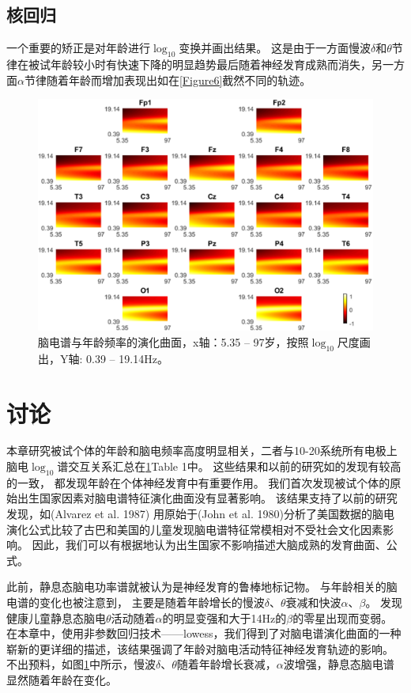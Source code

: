 \subsection{核回归}
一个重要的矫正是对年龄进行$\log_{10}$变换并画出结果。 这是由于一方面慢波$\delta$和$\theta$节律在被试年龄较小时有快速下降的明显趋势最后随着神经发育成熟而消失，另一方面$\alpha$节律随着年龄而增加表现出如在\ref{Figure6}截然不同的轨迹。
\begin{figure}[!ht]
\includegraphics[width=15cm]{pic/Norm/figure6.png}
\caption{脑电谱与年龄频率的演化曲面，x轴：5.35 – 97岁，按照$\log_{10}$尺度画出，Y轴: 0.39 – 19.14Hz。}
\label{fig6}
\end{figure}

\section{讨论}
本章研究被试个体的年龄和脑电频率高度明显相关，二者与10-20系统所有电极上脑电$\log_{10}$谱交互关系汇总在\ref{}Table 1中。 这些结果和以前的研究如\cite{Benninger et al. 1984; Smit et al. 2012; Vandenbosch et al. 2019}的发现有较高的一致， 都发现年龄在个体神经发育中有重要作用。 我们首次发现被试个体的原始出生国家因素对脑电谱特征演化曲面没有显著影响。 该结果支持了以前的研究发现，如\cite{}(Alvarez et al. 1987) 用原始于\cite{}(John et al. 1980)分析了美国数据的脑电演化公式比较了古巴和美国的儿童发现脑电谱特征常模相对不受社会文化因素影响。 因此，我们可以有根据地认为出生国家不影响描述大脑成熟的发育曲面、公式。

此前，静息态脑电功率谱就被认为是神经发育的鲁棒地标记物。 与年龄相关的脑电谱的变化也被注意到， 主要是随着年龄增长的慢波$\delta$、$\theta$衰减和快波$\alpha$、$\beta$。 
\cite{Lubar 1985}发现健康儿童静息态脑电$\theta$活动随着$\alpha$的明显变强和大于14Hz的$\beta$的零星出现而变弱。 在本章中，使用非参数回归技术——lowess，我们得到了对脑电谱演化曲面的一种崭新的更详细的描述，该结果强调了年龄对脑电活动特征神经发育轨迹的影响。 不出预料，如图\ref{fig6}中所示，慢波$\delta$、$\theta$随着年龄增长衰减，$\alpha$波增强，静息态脑电谱显然随着年龄在变化。

